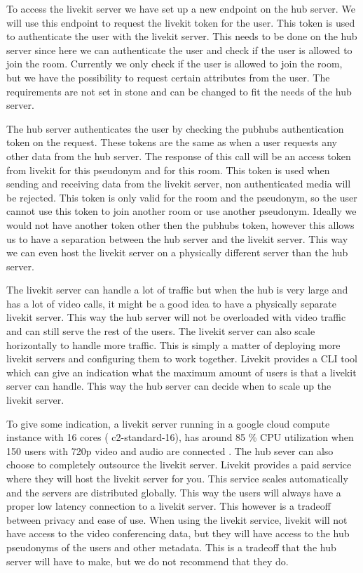 \documentclass{report}
\begin{document}
To access the livekit server we have set up a new endpoint on the hub server. We will use this endpoint to request
the livekit token for the user. This token is used to authenticate the user with the livekit server. This needs to
be done on the hub server since here we can authenticate the user and check if the user is allowed to join the room.
Currently we only check if the user is allowed to join the room, but we have the possibility to request certain
attributes from the user. The requirements are not set in stone and can be changed to fit the needs of the hub server.

The hub server authenticates the user by checking the pubhubs authentication token on the request. These tokens are
the same as when a user requests any other data from the hub server. The response of this call will be an
access token from livekit for this pseudonym and for this room. This token is used when sending and receiving data
from the livekit server, non authenticated media will be rejected. This token is only valid for the room and the
pseudonym, so the user cannot use this token to join another room or use another pseudonym. Ideally we would not
have another token other then the pubhubs token, however this allows us to have a separation between the hub server
and the livekit server. This way we can even host the livekit server on a physically different server than the hub
server.

The livekit server can handle a lot of traffic but when the hub is very large and has a lot of video calls, it
might be a good idea to have a physically separate livekit server. This way the hub server will not be overloaded with
video traffic and can still serve the rest of the users. The livekit server can also scale horizontally to handle
more traffic. This is simply a matter of deploying more livekit servers and configuring them to work together.
Livekit provides a CLI tool which can give an indication what the maximum amount of users is that a livekit server
can handle. This way the hub server can decide when to scale up the livekit server.

To give some indication, a livekit server running in a google cloud compute instance with 16 cores (
c2-standard-16), has around 85 \% CPU utilization when 150 users with 720p video and audio are connected
\cite{noauthor_benchmarking_nodate}. The hub sever can also choose to completely outsource the livekit server.
Livekit provides a paid service where they will host the livekit server for you. This service scales
automatically and the servers are distributed globally. This way the users will always have a proper low
latency connection to a livekit server. This however is a tradeoff between privacy and ease of use. When using
the livekit service, livekit will not have access to the video conferencing data, but they will have access to
the hub pseudonyms of the users and other metadata. This is a tradeoff that the hub server will have to make,
but we do not recommend that they do.
\end{document}
